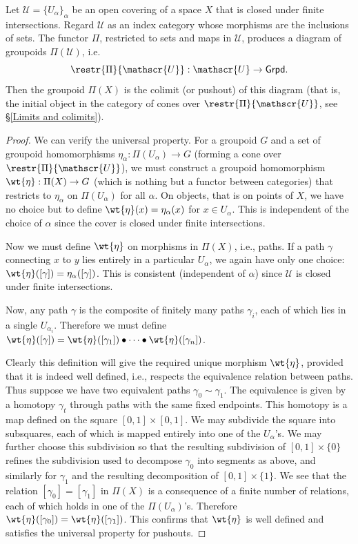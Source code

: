 \begin{thm}
    Let $\mathscr{U}=\{U_\alpha\}_\alpha$ be an open covering of a space $X$ that is closed under finite intersections. Regard $\mathscr{U}$ as an index category whose morphisms are the inclusions of sets. The functor $\Pi$, restricted to sets and maps in $\mathscr{U}$, produces a diagram of groupoids $\Pi(\mathscr{U})$, i.e.
    \[\restr{\Pi}{\mathscr{U}}: \mathscr{U}\to \mathsf{Grpd}.\]
    Then the groupoid $\Pi(X)$ is the colimit (or pushout) of this diagram (that is, the initial object in the category of cones over $\restr{\Pi}{\mathscr{U}}$, see \S\ref{Limits and colimits}).
\end{thm}
\begin{proof}
    We can verify the universal property. For a groupoid $G$ and a set of groupoid homomorphisms $\eta_\alpha:\Pi(U_\alpha)\to G$ (forming a cone over $\restr{\Pi}{\mathscr{U}}$), we must construct a groupoid homomorphism $\wt{\eta}:\Pi(X)\to G$ (which is nothing but a functor between categories) that restricts to $\eta_\alpha$ on $\Pi(U_\alpha)$ for all $\alpha$. On objects, that is on points of $X$, we have no choice but to define $\wt{\eta}(x)=\eta_\alpha(x)$ for $x\in U_\alpha$. This is independent of the choice of $\alpha$ since the cover is closed under finite intersections.

    Now we must define $\wt{\eta}$ on morphisms in $\Pi(X)$, i.e., paths. If a path $\gamma$ connecting $x$ to $y$ lies entirely in a particular $U_\alpha$, we again have only one choice: $\wt{\eta}([\gamma])=\eta_\alpha([\gamma])$. This is consistent (independent of $\alpha$) since $\mathscr{U}$ is closed under finite intersections.

    Now, any path $\gamma$ is the composite of finitely many paths $\gamma_i$, each of which lies in a single $U_{\alpha_i}$. Therefore we must define $\wt{\eta}([\gamma])=\wt{\eta}([\gamma_1])\bullet \cdots \bullet \wt{\eta}([\gamma_n])$. 
    
    Clearly this definition will give the required unique morphism $\wt{\eta}$, provided that it is indeed well defined, i.e., respects the equivalence relation between paths. Thus suppose we have two equivalent paths $\gamma_0\sim \gamma_1$. The equivalence is given by a homotopy $\gamma_t$ through paths with the same fixed endpoints. This homotopy is a map defined on the square $[0,1]\times[0,1]$. We may subdivide the square into subsquares, each of which is mapped entirely into one of the $U_\alpha$'s. We may further choose this subdivision so that the resulting subdivision of $[0,1]\times\{0\}$ refines the subdivision used to decompose $\gamma_0$ into segments as above, and similarly for $\gamma_1$ and the resulting decomposition of $[0,1]\times \{1\}$. We see that the relation $[\gamma_0]=[\gamma_1]$ in $\Pi(X)$ is a consequence of a finite number of relations, each of which holds in one of the $\Pi(U_\alpha)$'s. Therefore $\wt{\eta}([\gamma_0])=\wt{\eta}([\gamma_1])$. This confirms that $\wt{\eta}$ is well defined and satisfies the universal property for pushouts.    
\end{proof}
